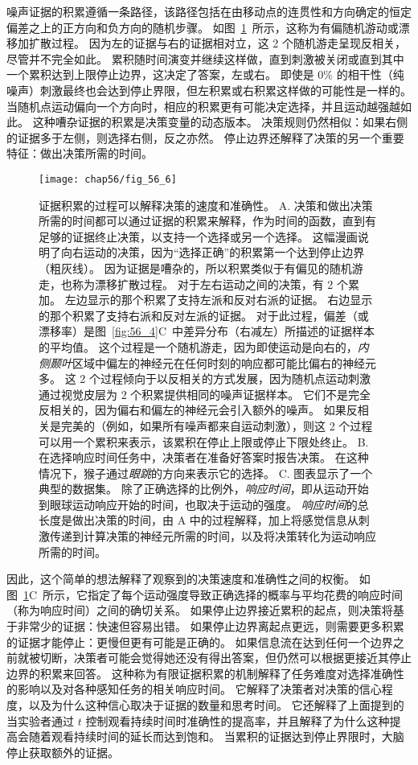噪声证据的积累遵循一条路径，该路径包括在由移动点的连贯性和方向确定的恒定偏差之上的正方向和负方向的随机步骤。
如图~\ref{fig:56_6}~所示，这称为有偏随机游动或漂移加扩散过程。
因为左的证据与右的证据相对立，这 2 个随机游走呈现反相关，尽管并不完全如此。
累积随时间演变并继续这样做，直到刺激被关闭或直到其中一个累积达到上限停止边界，这决定了答案，左或右。
即使是 0\% 的相干性（纯噪声）刺激最终也会达到停止界限，但左积累或右积累这样做的可能性是一样的。
当随机点运动偏向一个方向时，相应的积累更有可能决定选择，并且运动越强越如此。
这种嘈杂证据的积累是决策变量的动态版本。
决策规则仍然相似：如果右侧的证据多于左侧，则选择右侧，反之亦然。
停止边界还解释了决策的另一个重要特征：做出决策所需的时间。


\begin{figure}[htbp]
	\centering
	\texttt{[image: chap56/fig\_56\_6]}
	\caption{证据积累的过程可以解释决策的速度和准确性。
		A. 决策和做出决策所需的时间都可以通过证据的积累来解释，作为时间的函数，直到有足够的证据终止决策，以支持一个选择或另一个选择。
		这幅漫画说明了向右运动的决策，因为“选择正确”的积累第一个达到停止边界（粗灰线）。
		因为证据是嘈杂的，所以积累类似于有偏见的随机游走，也称为漂移扩散过程。
		对于左右运动之间的决策，有 2 个累加。
		左边显示的那个积累了支持左派和反对右派的证据。
		右边显示的那个积累了支持右派和反对左派的证据。
		对于此过程，偏差（或漂移率）是图~\ref{fig:56_4}C~中差异分布（右减左）所描述的证据样本的平均值。
		这个过程是一个随机游走，因为即使运动是向右的，\textit{内侧颞叶}区域中偏左的神经元在任何时刻的响应都可能比偏右的神经元多。
		这 2 个过程倾向于以反相关的方式发展，因为随机点运动刺激通过视觉皮层为 2 个积累提供相同的噪声证据样本。
		它们不是完全反相关的，因为偏右和偏左的神经元会引入额外的噪声。
		如果反相关是完美的（例如，如果所有噪声都来自运动刺激），则这 2 个过程可以用一个累积来表示，该累积在停止上限或停止下限处终止。
		B. 在选择响应时间任务中，决策者在准备好答案时报告决策。
		在这种情况下，猴子通过\textit{眼跳}的方向来表示它的选择。
		C. 图表显示了一个典型的数据集。
		除了正确选择的比例外，\textit{响应时间}，即从运动开始到眼球运动响应开始的时间，也取决于运动的强度。
		\textit{响应时间}的总长度是做出决策的时间，由 A 中的过程解释，加上将感觉信息从刺激传递到计算决策的神经元所需的时间，以及将决策转化为运动响应所需的时间\cite{gold2007neural}。 }
	\label{fig:56_6}
\end{figure}


因此，这个简单的想法解释了观察到的决策速度和准确性之间的权衡。
如图~\ref{fig:56_6}C~所示，它指定了每个运动强度导致正确选择的概率与平均花费的响应时间（称为响应时间）之间的确切关系。
如果停止边界接近累积的起点，则决策将基于非常少的证据：快速但容易出错。
如果停止边界离起点更远，则需要更多积累的证据才能停止：更慢但更有可能是正确的。
如果信息流在达到任何一个边界之前就被切断，决策者可能会觉得她还没有得出答案，但仍然可以根据更接近其停止边界的积累来回答。
这种称为有限证据积累的机制解释了任务难度对选择准确性的影响以及对各种感知任务的相关响应时间。
它解释了决策者对决策的信心程度，以及为什么这种信心取决于证据的数量和思考时间。
它还解释了上面提到的当实验者通过 $ t $ 控制观看持续时间时准确性的提高率，并且解释了为什么这种提高会随着观看持续时间的延长而达到饱和。
当累积的证据达到停止界限时，大脑停止获取额外的证据。



